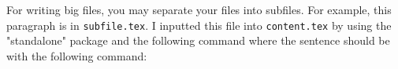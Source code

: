 \documentclass{article}
\title{     }
\author{     }
\date{     }
\begin{document}
For writing big files, you may separate your files into subfiles. For example, this paragraph is in \texttt{subfile.tex}. I inputted this file into \texttt{content.tex} by using the "standalone" package and the following command where the sentence should be with the following command:
\begin{verbatim}
 
\end{verbatim} 
\end{document}
